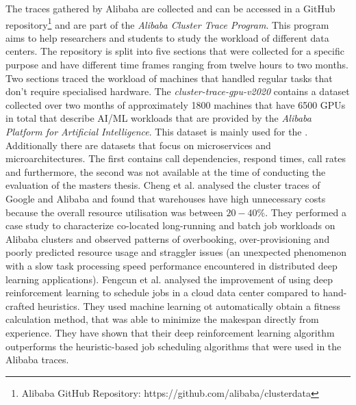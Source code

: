         The traces gathered by Alibaba are collected and can be accessed in a GitHub repository\footnote{Alibaba GitHub Repository: https://github.com/alibaba/clusterdata} and are part of the \emph{Alibaba Cluster Trace Program}. This program aims to help researchers and students to study the workload of different data centers. The repository is split into five sections that were collected for a specific purpose and have different time frames ranging from twelve hours to two months.
        Two sections traced the workload of machines that handled regular tasks that don't require specialised hardware. The \emph{cluster-trace-gpu-v2020} contains a dataset collected over two months of approximately 1800 machines that have 6500 GPUs in total that describe AI/ML workloads that are provided by the \emph{Alibaba Platform for Artificial Intelligence}. This dataset is mainly used for the . 
        Additionally there are datasets that focus on microservices and microarchitectures. The first contains call dependencies, respond times, call rates and furthermore, the second was not available at the time of conducting the evaluation of the masters thesis. Cheng et al. \cite{chengCharacterizingColocatedDatacenter2018} analysed the cluster traces of Google and Alibaba and found that warehouses have high unnecessary costs because the overall resource utilisation was between $20-40\%$. They performed a case study to characterize co-located long-running and batch job workloads on Alibaba clusters and observed patterns of overbooking, over-provisioning and poorly predicted resource usage and straggler issues (an unexpected phenomenon with a slow task processing speed performance encountered in distributed deep learning applications). Fengcun et al. \cite{fengcunDeepJSJobScheduling2023} analysed the improvement of using deep reinforcement learning to schedule jobs in a cloud data center compared to hand-crafted heuristics. They used machine learning ot automatically obtain a fitness calculation method, that was able to minimize the makespan directly from experience. They have shown that their deep reinforcement learning algorithm outperforms the heuristic-based job scheduling algorithms that were used in the Alibaba traces.
         

